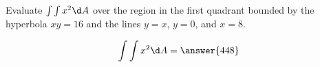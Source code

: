 \documentclass{ximera}
\author{David Guichard \and Neal Koblitz \and H. Jerome Keisler \and Albert Scheller \and Barry Balof \and Mike Wills \and Matthew Carr}
\begin{document}
\begin{exercise}




Evaluate $\int\int x^2\d A$ over the region in the first quadrant bounded by the hyperbola $xy=16$ and the lines $y=x$, $y=0$, and $x=8$.
\begin{prompt}
\[
\int\int x^2\d A=\answer{448}
\]
\end{prompt}



\end{exercise}
\end{document}
